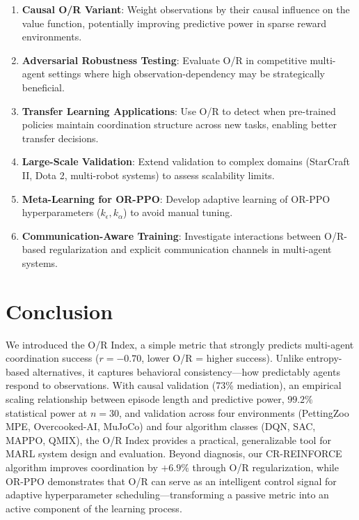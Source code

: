 \documentclass[twoside]{article}
\newcommand{\ORIndex}{O/R Index}
\theoremstyle{remark}
\begin{document}
\begin{enumerate}
    \item \textbf{Causal O/R Variant}: Weight observations by their causal influence on the value function, potentially improving predictive power in sparse reward environments.
    \item \textbf{Adversarial Robustness Testing}: Evaluate O/R in competitive multi-agent settings where high observation-dependency may be strategically beneficial.
    \item \textbf{Transfer Learning Applications}: Use O/R to detect when pre-trained policies maintain coordination structure across new tasks, enabling better transfer decisions.
    \item \textbf{Large-Scale Validation}: Extend validation to complex domains (StarCraft II, Dota 2, multi-robot systems) to assess scalability limits.
    \item \textbf{Meta-Learning for OR-PPO}: Develop adaptive learning of OR-PPO hyperparameters ($k_\epsilon, k_\alpha$) to avoid manual tuning.
    \item \textbf{Communication-Aware Training}: Investigate interactions between O/R-based regularization and explicit communication channels in multi-agent systems.
\end{enumerate}

\section{Conclusion}

We introduced the \ORIndex{}, a simple metric that strongly predicts multi-agent coordination success ($r = -0.70$, lower O/R = higher success). Unlike entropy-based alternatives, it captures behavioral consistency—how predictably agents respond to observations. With causal validation (73\% mediation), an empirical scaling relationship between episode length and predictive power, $99.2\%$ statistical power at $n = 30$, and validation across four environments (PettingZoo MPE, Overcooked-AI, MuJoCo) and four algorithm classes (DQN, SAC, MAPPO, QMIX), the \ORIndex{} provides a practical, generalizable tool for MARL system design and evaluation. Beyond diagnosis, our CR-REINFORCE algorithm improves coordination by $+6.9\%$ through O/R regularization, while OR-PPO demonstrates that O/R can serve as an intelligent control signal for adaptive hyperparameter scheduling—transforming a passive metric into an active component of the learning process.
\end{document}
